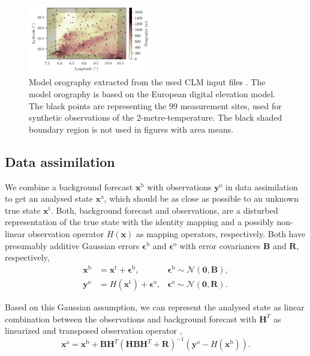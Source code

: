 \documentclass[hess, manuscript]{copernicus}
\begin{document}
\begin{figure}[ht]
	\includegraphics[width=0.48\textwidth]{figures/fig_02_orography.png}
	\caption{
		Model orography extracted from the used CLM input files \citep{european_environment_agency_digital_2013}.
		The model orography is based on the European digital elevation model.
		The black points are representing the 99 measurement sites, used for synthetic observations of the 2-metre-temperature.
		The black shaded boundary region is not used in figures with area means.
	}
	\label{fig:model_orography}
\end{figure}

\subsection{Data assimilation}

We combine a background forecast $\textbf{x}^{\text{b}}$ with observations $\mathbf{y}^\text{o}$ in data assimilation to get an analysed state $\textbf{x}^{\text{a}}$, which should be as close as possible to an unknown true state $\textbf{x}^{\text{t}}$.
Both, background forecast and observations, are a disturbed representation of the true state with the identity mapping and a possibly non-linear observation operator $H(\mathbf{x})$ as mapping operators, respectively.
Both have presumably additive Gaussian errors $\mathbf{\epsilon}^\text{b}$ and $\mathbf{\epsilon}^\text{o}$ with error covariances $\textbf{B}$ and $\textbf{R}$, respectively,
\begin{align}
	\mathbf{x}^\text{b} &= \mathbf{x}^\text{t} + \mathbf{\epsilon}^\text{b}, & \mathbf{\epsilon}^\text{b} \sim \mathcal{N}(\mathbf{0}, \mathbf{B}),\label{eq:formulation_kf_back}\\
	\mathbf{y}^\text{o} &= H(\mathbf{x}^\text{t}) + \mathbf{\epsilon}^\text{o}, & \mathbf{\epsilon}^\text{o} \sim \mathcal{N}(\mathbf{0}, \mathbf{R}).
	\label{eq:formulation_kf_obsop}
\end{align}

Based on this Gaussian assumption, we can represent the analysed state as linear combination between the observations and background forecast with $\mathbf{H}^{T}$ as linearized and transposed observation operator \citep{kalman_new_1960,kalnay_atmospheric_2003},
\begin{equation}
	\mathbf{x}^\text{a} = \mathbf{x}^\text{b} + \mathbf{B}\mathbf{H}^{T}(\mathbf{H}\mathbf{B}\mathbf{H}^{T} + \mathbf{R})^{-1} (\mathbf{y}^\text{o} - H(\mathbf{x}^\text{b})).\label{eq:formulation_kalman_filter}
\end{equation}
\end{document}
